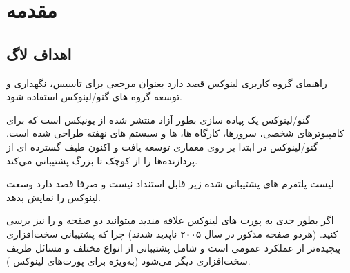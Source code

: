 
\section{مقدمه}

\subsection{اهداف لاگ}

راهنمای گروه کاربری لینوکس قصد دارد بعنوان مرجعی برای تاسیس، نگهداری
و توسعه گروه های گنو/لینوکس استفاده شود.

گنو/لینوکس یک پیاده سازی بطور آزاد منتشر شده از یونیکس است که برای کامپیوترهای شخصی،
سرورها، کارگاه ها،  ها و سیستم های نهفته طراحی شده است.
گنو/لینوکس در ابتدا بر روی معماری  توسعه یافت و اکنون طیف گسترده ای از پردازنده‌ها
را از کوچک تا بزرگ پشتیبانی می‌کند.

\begin{note}
لیست پلتفرم های پشتیبانی شده زیر قابل استنداد نیست و صرفا قصد دارد وسعت لینوکس را نمایش بدهد.
\end{note}


اگر بطور جدی به پورت های لینوکس علاقه مندید میتوانید دو صفحه
و
را نیز برسی کنید.  (هردو صفحه مذکور در سال ۲۰۰۵ ناپدید شدند)
چرا که پشتیبانی سخت‌افزاری پیچیده‌تر از عملکرد عمومی  است و شامل پشتیبانی از
انواع مختلف  و مسائل ظریف سخت‌افزاری دیگر می‌شود (به‌ویژه برای پورت‌های لینوکس
).



